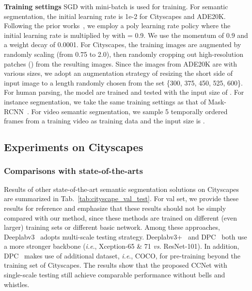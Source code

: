 \documentclass[10pt,journal,compsoc]{IEEEtran}
\def\ie{\emph{i.e}.} \def\Ie{\emph{I.e}.}
\begin{document}
\vspace{1em}
\noindent\textbf{Training settings}
SGD with mini-batch is used for training. For semantic segmentation, the initial learning rate is 1e-2 for Cityscapes and ADE20K. Following the prior works~\cite{chen2018deeplab, zhang2018context}, we employ a poly learning rate policy where the initial learning rate is multiplied by  with  = 0.9. We use the momentum of 0.9 and a weight decay of 0.0001. For Cityscapes, the training images are augmented by randomly scaling (from 0.75 to 2.0), then randomly cropping out high-resolution patches () from the resulting images. Since the images from ADE20K are with various sizes, we adopt an augmentation strategy of resizing the short side of input image to a length randomly chosen from the set \{300, 375, 450, 525, 600\}. For human parsing, the model are trained and tested with the input size of . For instance segmentation, we take the same training settings as that of Mask-RCNN~\cite{he2017mask}. For video semantic segmentation, we sample 5 temporally ordered frames from a training video as training data and the input size is .

\subsection{Experiments on Cityscapes}

\subsubsection{Comparisons with state-of-the-arts}
Results of other state-of-the-art semantic segmentation solutions on Cityscapes are summarized in Tab.~\ref{tab:cityscape_val_test}. For val set, we provide these results for reference and emphasize that these results should not be simply compared with our method, since these methods are trained on different (even larger) training sets or different basic network. Among these approaches, Deeplabv3~\cite{chen2017rethinking} adopts multi-scale testing strategy. Deeplabv3+~\cite{chen2018encoder} and DPC~\cite{chen2018searching} both use a more stronger backbone (\ie, Xception-65 \& 71 \emph{vs.} ResNet-101). In addition, DPC~\cite{chen2018searching} makes use of additional dataset, \ie, COCO, for pre-training beyond the training set of Cityscapes. The results show that the proposed CCNet with single-scale testing still achieve comparable performance without bells and whistles. 
\end{document}
